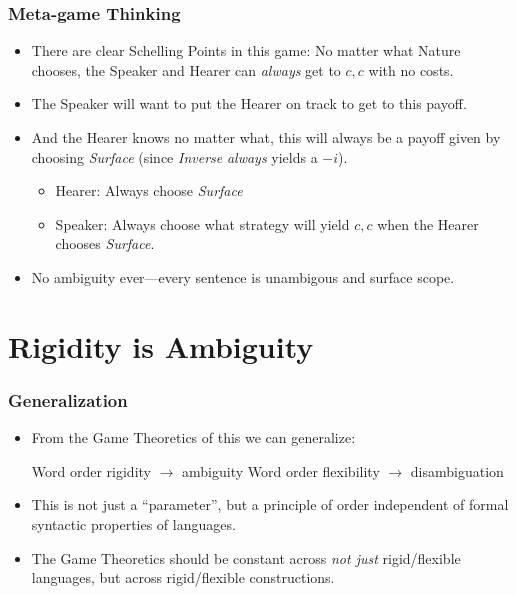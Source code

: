 \documentclass[aspectratio=169]{beamer}
\begin{document}
	\begin{frame}
		\frametitle{Meta-game Thinking}\pause

		\begin{itemize}
			\item There are clear Schelling Points in this game: No matter what Nature chooses, the Speaker and Hearer can \emph{always} get to $c,c$ with no costs.\pause
			\item The Speaker will want to put the Hearer on track to get to this payoff.\pause
			\item And the Hearer knows no matter what, this will always be a payoff given by choosing \textit{Surface} (since \textit{Inverse} \emph{always} yields a $-i$).\pause
				\begin{itemize}
					\item Hearer: Always choose \textit{Surface}\pause
					\item Speaker: Always choose what strategy will yield $c,c$ when the Hearer chooses \textit{Surface}.\pause
				\end{itemize}

			\item No ambiguity ever---every sentence is unambigous and surface scope.
	\end{itemize}
\end{frame}

\section{Rigidity is Ambiguity}

\begin{frame}
	\frametitle{Generalization}\pause
	\begin{itemize}
		\item From the Game Theoretics of this we can generalize:\pause
			\begin{exe}
				\ex Word order rigidity ${\rightarrow}$ ambiguity\pause
				\ex Word order flexibility ${\rightarrow}$ disambiguation\pause
			\end{exe}

		\item This is not just a ``parameter'', but a principle of order independent of formal syntactic properties of languages.\pause
		\item The Game Theoretics should be constant across \emph{not just} rigid/flexible languages, but across rigid/flexible constructions.
	\end{itemize}
\end{frame}
\end{document}
